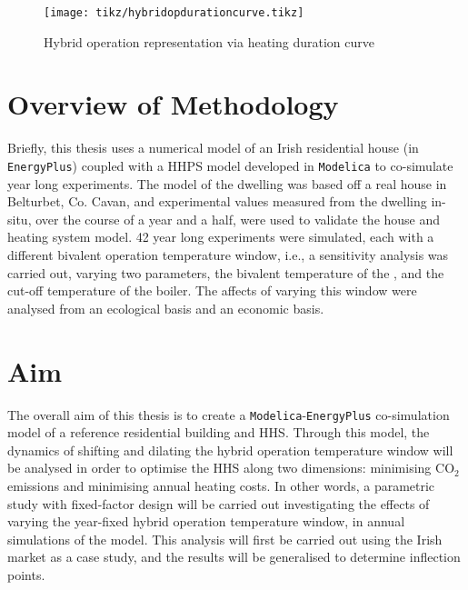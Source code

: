 \begin{figure}[htb]
    \centering
    \texttt{[image: tikz/hybridopdurationcurve.tikz]}
    \caption{Hybrid operation representation via heating duration curve}
    \label{fig:heatingloaddurationcurvebiv}
\end{figure}

\section{Overview of Methodology}
Briefly, this thesis uses a numerical model of an Irish residential house (in \texttt{EnergyPlus}) coupled with a \ac{HHPS} model developed in \texttt{Modelica} to co-simulate year long experiments. The model of the dwelling was based off a real house in Belturbet, Co. Cavan, and experimental values measured from the dwelling in-situ, over the course of a year and a half, were used to validate the house and heating system model. 42 year long experiments were simulated, each with a different bivalent operation temperature window, i.e., a sensitivity analysis was carried out, varying two parameters, the bivalent temperature of the \HP, and the cut-off temperature of the boiler. The affects of varying this window were analysed from an ecological basis and an economic basis. 

\section{Aim}
The overall aim of this thesis is to create a \texttt{Modelica}-\texttt{EnergyPlus} co-simulation model of a reference residential building and \ac{HHS}. Through this model, the dynamics of shifting and dilating the hybrid operation temperature window will be analysed in order to optimise the \ac{HHS} along two dimensions: minimising $\text{CO}_2$ emissions and minimising annual heating costs. In other words, a parametric study with fixed-factor design will be carried out investigating the effects of varying the year-fixed hybrid operation temperature window, in annual simulations of the model. This analysis will first be carried out using the Irish market as a case study, and the results will be generalised to determine inflection points.

